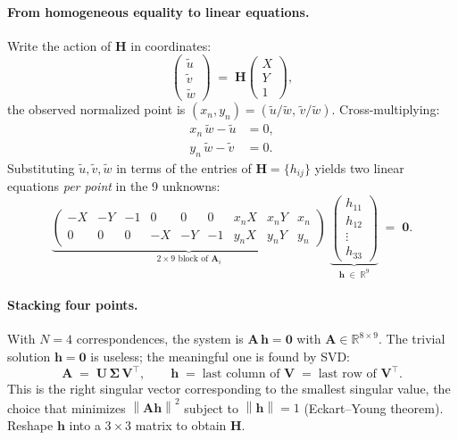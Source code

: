 \documentclass[11pt]{article}
\newcommand{\R}{\mathbb{R}}
\newcommand{\norm}[1]{\left\lVert #1 \right\rVert}
\newcommand{\Hom}{\mathbf{H}}
\begin{document}
\paragraph{From homogeneous equality to linear equations.}
Write the action of $\Hom$ in coordinates:
\begin{equation}
  \begin{pmatrix} \tilde u \\ \tilde v \\ \tilde w \end{pmatrix}
  \;=\; \Hom \begin{pmatrix} X \\ Y \\ 1 \end{pmatrix},
\end{equation}
the observed normalized point is $(x_n, y_n) = (\tilde u/\tilde w,\,\tilde v/\tilde w)$.
Cross-multiplying:
\begin{align}
  x_n\,\tilde w - \tilde u &= 0, \\
  y_n\,\tilde w - \tilde v &= 0.
\end{align}
Substituting $\tilde u, \tilde v, \tilde w$ in terms of the entries of
$\Hom = \{h_{ij}\}$ yields two linear equations \emph{per point} in the
9 unknowns:
\begin{equation}
  \underbrace{
  \begin{pmatrix}
    -X & -Y & -1 &  0 &  0 & 0 & x_n X & x_n Y & x_n \\
     0 &  0 &  0 & -X & -Y & -1 & y_n X & y_n Y & y_n
  \end{pmatrix}}_{2\times 9 \text{ block of } \mathbf{A}_i}
  \;
  \underbrace{
  \begin{pmatrix} h_{11} \\ h_{12} \\ \vdots \\ h_{33} \end{pmatrix}}_{\mathbf{h} \;\in\; \R^9}
  \;=\; \mathbf{0}.
\end{equation}

\paragraph{Stacking four points.}
With $N = 4$ correspondences, the system is $\mathbf{A}\,\mathbf{h} = \mathbf{0}$
with $\mathbf{A} \in \R^{8 \times 9}$. The trivial solution $\mathbf{h} = \mathbf{0}$ is useless;
the meaningful one is found by SVD:
\begin{equation}
  \mathbf{A} \;=\; \mathbf{U}\,\boldsymbol{\Sigma}\,\mathbf{V}^\top,
  \qquad
  \mathbf{h} \;=\; \text{last column of } \mathbf{V} \;=\; \text{last row of } \mathbf{V}^\top.
\end{equation}
This is the right singular vector corresponding to the smallest singular
value, the choice that minimizes $\norm{\mathbf{A}\mathbf{h}}^2$ subject to
$\norm{\mathbf{h}} = 1$ (Eckart--Young theorem). Reshape $\mathbf{h}$ into a
$3 \times 3$ matrix to obtain $\Hom$.
\end{document}
